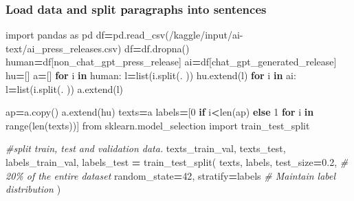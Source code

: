 \documentclass[
]{article}
\newenvironment{Shaded}{\begin{snugshade}}{\end{snugshade}}
\newcommand{\BuiltInTok}[1]{#1}
\newcommand{\CommentTok}[1]{\textcolor[rgb]{0.56,0.35,0.01}{\textit{#1}}}
\newcommand{\ControlFlowTok}[1]{\textcolor[rgb]{0.13,0.29,0.53}{\textbf{#1}}}
\newcommand{\DecValTok}[1]{\textcolor[rgb]{0.00,0.00,0.81}{#1}}
\newcommand{\FloatTok}[1]{\textcolor[rgb]{0.00,0.00,0.81}{#1}}
\newcommand{\ImportTok}[1]{#1}
\newcommand{\KeywordTok}[1]{\textcolor[rgb]{0.13,0.29,0.53}{\textbf{#1}}}
\newcommand{\NormalTok}[1]{#1}
\newcommand{\OperatorTok}[1]{\textcolor[rgb]{0.81,0.36,0.00}{\textbf{#1}}}
\newcommand{\StringTok}[1]{\textcolor[rgb]{0.31,0.60,0.02}{#1}}
\begin{document}
\subsubsection{Load data and split paragraphs into
sentences}\label{load-data-and-split-paragraphs-into-sentences}

\begin{Shaded}
\begin{Highlighting}[]
\ImportTok{import}\NormalTok{ pandas }\ImportTok{as}\NormalTok{ pd}
\NormalTok{df}\OperatorTok{=}\NormalTok{pd.read\_csv(}\StringTok{\textquotesingle{}/kaggle/input/ai{-}text/ai\_press\_releases.csv\textquotesingle{}}\NormalTok{)}
\NormalTok{df}\OperatorTok{=}\NormalTok{df.dropna()}
\NormalTok{human}\OperatorTok{=}\NormalTok{df[}\StringTok{\textquotesingle{}non\_chat\_gpt\_press\_release\textquotesingle{}}\NormalTok{]}
\NormalTok{ai}\OperatorTok{=}\NormalTok{df[}\StringTok{\textquotesingle{}chat\_gpt\_generated\_release\textquotesingle{}}\NormalTok{]}
\NormalTok{hu}\OperatorTok{=}\NormalTok{[]}
\NormalTok{a}\OperatorTok{=}\NormalTok{[]}
\ControlFlowTok{for}\NormalTok{ i }\KeywordTok{in}\NormalTok{ human:}
\NormalTok{    l}\OperatorTok{=}\BuiltInTok{list}\NormalTok{(i.split(}\StringTok{\textquotesingle{}. \textquotesingle{}}\NormalTok{))}
\NormalTok{    hu.extend(l)}
\ControlFlowTok{for}\NormalTok{ i }\KeywordTok{in}\NormalTok{ ai:}
\NormalTok{    l}\OperatorTok{=}\BuiltInTok{list}\NormalTok{(i.split(}\StringTok{\textquotesingle{}. \textquotesingle{}}\NormalTok{))}
\NormalTok{    a.extend(l)}

\NormalTok{ap}\OperatorTok{=}\NormalTok{a.copy()}
\NormalTok{a.extend(hu)}
\NormalTok{texts}\OperatorTok{=}\NormalTok{a}
\NormalTok{labels}\OperatorTok{=}\NormalTok{[}\DecValTok{0} \ControlFlowTok{if}\NormalTok{ i}\OperatorTok{\textless{}}\BuiltInTok{len}\NormalTok{(ap) }\ControlFlowTok{else} \DecValTok{1} \ControlFlowTok{for}\NormalTok{ i }\KeywordTok{in} \BuiltInTok{range}\NormalTok{(}\BuiltInTok{len}\NormalTok{(texts))]}
\ImportTok{from}\NormalTok{ sklearn.model\_selection }\ImportTok{import}\NormalTok{ train\_test\_split}

\CommentTok{\#split train, test and validation data. }
\NormalTok{texts\_train\_val, texts\_test, labels\_train\_val, labels\_test }\OperatorTok{=}\NormalTok{ train\_test\_split(}
\NormalTok{    texts,}
\NormalTok{    labels,}
\NormalTok{    test\_size}\OperatorTok{=}\FloatTok{0.2}\NormalTok{,       }\CommentTok{\# 20\% of the entire dataset}
\NormalTok{    random\_state}\OperatorTok{=}\DecValTok{42}\NormalTok{,}
\NormalTok{    stratify}\OperatorTok{=}\NormalTok{labels      }\CommentTok{\# Maintain label distribution}
\NormalTok{)}


\end{Highlighting}
\end{Shaded}
\end{document}
